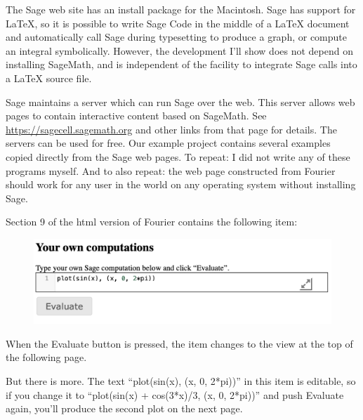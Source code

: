 \documentclass[11pt, oneside]{article}   	%
\begin{document}
The Sage web site has an install package for the Macintosh. Sage has support for LaTeX, so it is possible to write Sage Code in the middle of a LaTeX document and automatically call Sage during typesetting to produce a graph, or compute an integral symbolically. However, the development I'll show does not depend on installing SageMath, and is independent of the facility to integrate Sage calls into a LaTeX source file.

Sage maintains a server which can run Sage over the web. This server allows web pages to contain interactive content based on SageMath. See 
\url{https://sagecell.sagemath.org} and other links from that page for details. The servers can be used for free. Our example project contains several examples copied directly from the Sage web pages. To repeat: I did not write any of these programs myself. And to also repeat: the web page constructed from Fourier should work for any user in the world on any operating system without installing Sage.

Section 9 of the html version of Fourier contains the following item:

\begin{figure}[htbp] %
     \includegraphics[width=5in.]{Graphics/shot6.png} %
\end{figure}
\vspace{.2in}

When the Evaluate button is pressed, the item changes to the view at the top of the following page.

But there is more. The 
text ``plot(sin(x), (x, 0, 2*pi))'' in this item is editable, so if you change it to ``plot(sin(x) + cos(3*x)/3, (x, 0, 2*pi))'' and push Evaluate again, you'll produce the second plot on the next page. 
\newpage
\end{document}

